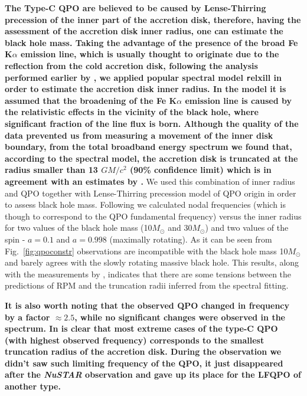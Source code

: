 \documentclass[a4paper,fleqn,usenatbib]{mnras}
\begin{document}
{\bf 
The Type-C QPO are believed to be caused by Lense-Thirring precession of the inner part of the accretion disk, therefore, having the assessment of the accretion disk inner radius, one can estimate the black hole mass.
Taking the advantage of the presence of the broad Fe K$\alpha$ emission line, which is usually thought to originate due to the reflection from the cold accretion disk, following the analysis performed earlier by \citet{miller15_nust}, we applied popular spectral model {\texttt relxill} \citep{garcia14} in order to estimate the accretion disk inner radius.
In the model it is assumed that the broadening of the Fe K$\alpha$ emission line is caused by the relativistic effects in the vicinity of the black hole, where significant fraction of the line flux is born. 
Although the quality of the data prevented us from measuring a movement of the inner disk boundary, from the total broadband energy spectrum we found that, according to the spectral model, the accretion disk is truncated at the radius smaller than 13 $GM/c^{2}$ (90\% confidence limit) which is in agreement with an estimates by \citet{miller15_nust}. 
}
We used this combination of inner radius and QPO together with Lense-Thirring precession model of QPO origin \citep{ingram09} in order to assess black hole mass. 
Following \citet{ingram14} we calculated nodal frequencies (which is though to correspond to the QPO fundamental frequency) versus the inner radius for two values of the black hole mass (10$M_{\odot}$ and 30$M_{\odot}$) and two values of the spin - $a=0.1$ and $a=0.998$ (maximally rotating). 
As it can be seen from Fig.~\ref{fig:qpoconstr} observations are incompatible with the black hole mass 10$M_{\odot}$ and barely agrees with the slowly rotating massive black hole. 
This results, along with the measurements by \cite{fuerst16_gx339}, indicates that there are some tensions between the predictions of RPM and the truncation radii inferred from the spectral fitting.
{\bf
        It is also worth noting that the observed QPO changed in frequency by a factor $\approx2.5$, while no significant changes were observed in the spectrum. 
        In is clear that most extreme cases of the type-C QPO (with highest observed frequency) corresponds to the smallest truncation radius of the accretion disk.
        During the observation we didn't saw such limiting frequency of the QPO, it just disappeared after the {\it NuSTAR} observation and gave up its place for the LFQPO of another type.


}
\end{document}
